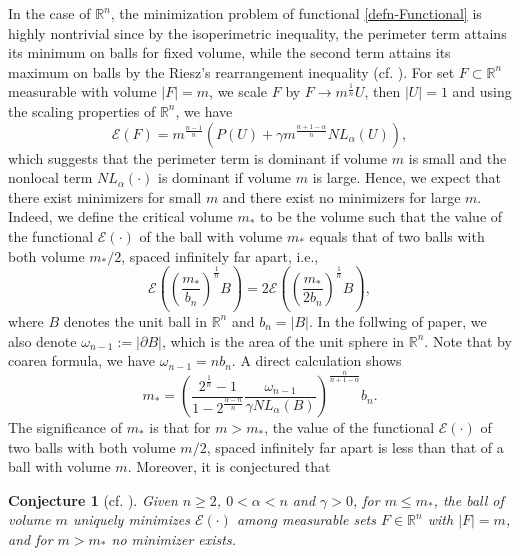 \documentclass[11pt,reqno]{amsart}
\newtheorem{con}[thm]{Conjecture}
\theoremstyle{definition}
\theoremstyle{remark}
\numberwithin{equation}{section}
\renewcommand{\(}{\left(}
\renewcommand{\)}{\right)}
\renewcommand{\-}{\overline}
\begin{document}
In the case of $\mathbb{R}^n$, the minimization problem of functional \eqref{defn-Functional} is highly nontrivial since by the isoperimetric inequality, the perimeter  term attains its minimum on balls for fixed volume, while the second term attains its maximum on balls by the Riesz's rearrangement inequality (cf. \cite[Theorem 3.7]{Leib-Loss01}). For set $F\subset\mathbb{R}^n$ measurable with volume $|F|=m$, we scale $F$ by $F\to m^{\frac{1}{n}}U$, then $|U|=1$ and using the scaling properties of $\mathbb{R}^n$, we have
\begin{equation}\label{Ex-scale}
	\mathcal{E}(F)=m^{\frac{n-1}{n}}\left(P(U)+\gamma m^{\frac{n+1-\alpha}{n}}NL_{\alpha}(U)\right),
\end{equation}
which suggests that the perimeter term is dominant if volume $m$ is small and the nonlocal term $NL_{\alpha}(\cdot)$ is dominant if volume $m$ is large. Hence, we expect that there exist minimizers for small $m$ and there exist no minimizers for large $m$. Indeed, we define the critical volume $m_{*}$ to be the volume such that the value of the functional $\mathcal{E}(\cdot)$ of the ball with volume $m_{*}$ equals that of two balls with both volume $m_{*}/2$, spaced infinitely far apart, i.e.,
\begin{equation*}
	\mathcal{E}\left(\left(\frac{m_{*}}{b_n}\right)^{\frac{1}{n}}B\right)=2\mathcal{E}\left(\left(\frac{m_{*}}{2 b_n}\right)^{\frac{1}{n}}B\right),
\end{equation*}
where $B$ denotes the unit ball in $\mathbb{R}^n$ and $b_n=|B|$. In the follwing of paper, we also denote $\omega_{n-1}:=|\partial B|$, which is the area of the unit sphere in $\mathbb{R}^n$. Note that by coarea formula, we have $\omega_{n-1}=n b_n$.  A direct calculation shows
\begin{equation}\label{Eq-Cri}
	m_{*}=\left(\frac{2^{\frac{1}{n}}-1}{1-2^{\frac{\alpha-n}{n}}}\frac{\omega_{n-1}}{\gamma NL_{\alpha}(B)}\right)^{\frac{n}{n+1-\alpha}}b_n.
\end{equation}
The significance of $m_{*}$ is that for $m>m_{*}$, the value of the functional $\mathcal{E}(\cdot)$ of two balls with both volume $m/2$, spaced infinitely far apart is less than that of a ball with volume $m$. Moreover, it is conjectured that
\begin{con}[cf. \cite{Choksi-Peletier11}]\label{Con-Cri}
	Given $n\geq 2$, $0<\alpha<n$ and $\gamma>0$, for $m\leq m_{*}$, the ball of volume $m$ uniquely minimizes $\mathcal{E}(\cdot)$ among measurable sets $F\in\mathbb{R}^n$ with $|F|=m$, and for $m>m_{*}$ no minimizer exists.
	\end{con}
\end{document}

